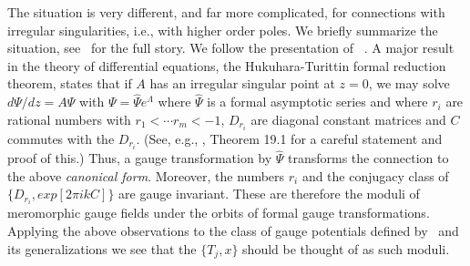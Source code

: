 The situation is very different, and far more complicated, 
for connections with irregular singularities, i.e., with
higher order poles. 
We briefly summarize the situation, see
\nref{}
\nref{}
\nref{}
\nref{}
\nref{}
\nref{}
\nref{}
\nref{}\ 
for the full story. We follow the presentation of \VII\Majima\ .
A major result in the theory of differential equations, the
Hukuhara-Turittin formal reduction theorem,
states that if $A$ has an irregular singular point at $z=0$, 
we may 
solve $d\Psi/dz= A \Psi$ with $\Psi=\hat\Psi e^\Lambda$ 
where $\hat\Psi$ is a formal asymptotic series and 
\eqn{}
where $r_i$ are rational numbers with $r_1<\cdots r_m <-1$,
$D_{r_i}$ are diagonal constant matrices and $C$ commutes 
with the $D_{r_i}$. (See, e.g., \Wasow ,
Theorem 19.1 for a careful statement and proof of this.)
Thus, a gauge transformation by 
$\hat\Psi$ transforms the connection to the above {\it canonical 
form}. Moreover, the numbers $r_i$ and the conjugacy class of 
$\{D_{r_i},exp[2\pi i k C]\}$ are gauge invariant. These are 
therefore the moduli of meromorphic gauge fields under
the orbits of formal gauge transformations. 
Applying the above observations to the class of gauge potentials 
defined by \dforz\ and its generalizations we see that 
the $\{T_j,x\}$ should be thought of as such moduli. 

